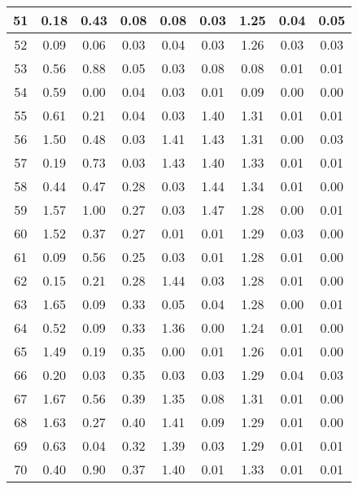 \begin{table}[h!]
\begin{tabular}{|c|c|c|c|c|c|c|c|c|}
51           & 0.18 & 0.43 & 0.08 & 0.08 & 0.03 & 1.25 & 0.04  & 0.05  \\ \hline
52           & 0.09 & 0.06 & 0.03 & 0.04 & 0.03 & 1.26 & 0.03  & 0.03  \\ \hline
53           & 0.56 & 0.88 & 0.05 & 0.03 & 0.08 & 0.08 & 0.01  & 0.01  \\ \hline
54           & 0.59 & 0.00 & 0.04 & 0.03 & 0.01 & 0.09 & 0.00  & 0.00  \\ \hline
55           & 0.61 & 0.21 & 0.04 & 0.03 & 1.40 & 1.31 & 0.01  & 0.01  \\ \hline
56           & 1.50 & 0.48 & 0.03 & 1.41 & 1.43 & 1.31 & 0.00  & 0.03  \\ \hline
57           & 0.19 & 0.73 & 0.03 & 1.43 & 1.40 & 1.33 & 0.01  & 0.01  \\ \hline
58           & 0.44 & 0.47 & 0.28 & 0.03 & 1.44 & 1.34 & 0.01  & 0.00  \\ \hline
59           & 1.57 & 1.00 & 0.27 & 0.03 & 1.47 & 1.28 & 0.00  & 0.01  \\ \hline
60           & 1.52 & 0.37 & 0.27 & 0.01 & 0.01 & 1.29 & 0.03  & 0.00  \\ \hline
61           & 0.09 & 0.56 & 0.25 & 0.03 & 0.01 & 1.28 & 0.01  & 0.00  \\ \hline
62           & 0.15 & 0.21 & 0.28 & 1.44 & 0.03 & 1.28 & 0.01  & 0.00  \\ \hline
63           & 1.65 & 0.09 & 0.33 & 0.05 & 0.04 & 1.28 & 0.00  & 0.01  \\ \hline
64           & 0.52 & 0.09 & 0.33 & 1.36 & 0.00 & 1.24 & 0.01  & 0.00  \\ \hline
65           & 1.49 & 0.19 & 0.35 & 0.00 & 0.01 & 1.26 & 0.01  & 0.00  \\ \hline
66           & 0.20 & 0.03 & 0.35 & 0.03 & 0.03 & 1.29 & 0.04  & 0.03  \\ \hline
67           & 1.67 & 0.56 & 0.39 & 1.35 & 0.08 & 1.31 & 0.01  & 0.00  \\ \hline
68           & 1.63 & 0.27 & 0.40 & 1.41 & 0.09 & 1.29 & 0.01  & 0.00  \\ \hline
69           & 0.63 & 0.04 & 0.32 & 1.39 & 0.03 & 1.29 & 0.01  & 0.01  \\ \hline
70           & 0.40 & 0.90 & 0.37 & 1.40 & 0.01 & 1.33 & 0.01  & 0.01  \\ \hline
\end{tabular}
\end{table}